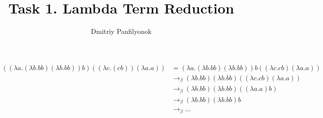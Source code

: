 \documentclass{article}
\title{Task 1. Lambda Term Reduction}
\author{Dmitriy Panfilyonok}
\date{}
\begin{document}
    \maketitle
    
    \paragraph{}
    \begin{align*}
        ((\lambda a.(\lambda b.bb)(\lambda b.bb))b)((\lambda c.(cb))(\lambda a.a))
        & = (\lambda a.(\lambda b.bb)(\lambda b.bb))b((\lambda c.cb)(\lambda a.a)) \\
        & \rightarrow_\beta (\lambda b.bb)(\lambda b.bb)((\lambda c.cb)(\lambda a.a)) \\
        & \rightarrow_\beta (\lambda b.bb)(\lambda b.bb)((\lambda a.a)b) \\
        & \rightarrow_\beta (\lambda b.bb)(\lambda b.bb)b \\
        & \rightarrow_\beta \ldots
    \end{align*}
    
\end{document}
